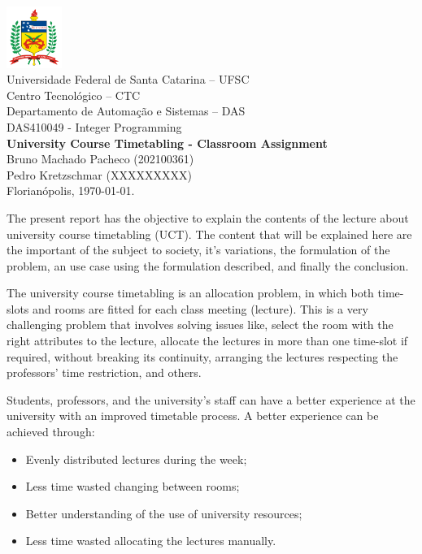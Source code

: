\documentclass[a4paper,11pt]{article}
\begin{document}
	\thispagestyle{empty}
\begin{center}
	\includegraphics[height=2cm]{imagens/logoUFSCsimples.png} \\
	{\Large Universidade Federal de Santa Catarina -- UFSC} \\
	{\Large Centro Tecnológico -- CTC} \\
	{\Large Departamento de Automação e Sistemas -- DAS} \\
	\vspace{1cm}
	{\large DAS410049 - Integer Programming} \\
	\vfill
	\large{\textbf{University Course Timetabling - Classroom Assignment} \\
	} 
	\vspace{1cm}
    Bruno Machado Pacheco (202100361) \\
    Pedro Kretzschmar (XXXXXXXXX) \\
    \vfill
	Florianópolis, \today.
\end{center}

\clearpage

\tableofcontents

\clearpage



\FloatBarrier
The present report has the objective to explain the contents of the lecture about university course timetabling (UCT). The content that will be explained here are the important of the subject to society, it's variations, the formulation of the problem, an use case using the formulation described, and finally the conclusion.
\newpage


\FloatBarrier
The university course timetabling is an allocation problem, in which both time-slots and rooms are fitted for each class meeting (lecture). This is a very challenging problem that involves solving issues like, select the room with the right attributes to the lecture, allocate the lectures in more than one time-slot if required, without breaking its continuity, arranging the lectures respecting the professors' time restriction, and others.


Students, professors, and the university's staff can have a better experience at the university with an improved timetable process. A better experience can be achieved through:
\begin{itemize}
    \item Evenly distributed lectures during the week;
    \item Less time wasted changing between rooms;
    \item Better understanding of the use of university resources;
    \item Less time wasted allocating the lectures manually.
\end{itemize}
\end{document}
